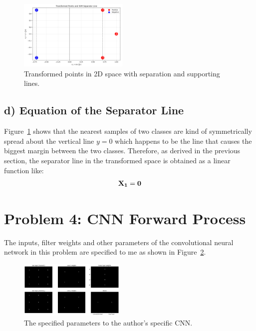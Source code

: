 \documentclass[conference]{IEEEtran}
\begin{document}
\begin{figure}[htbp]
    \centerline{\includegraphics[width=0.465\textwidth]{figures/prob3.png}}
    \caption{Transformed points in 2D space with separation and supporting lines.}
    \label{fig:prob3}
\end{figure}

\subsection*{d) Equation of the Separator Line}
Figure~\ref{fig:prob3} shows that the nearest samples of two classes are kind of symmetrically spread about the vertical line $y = 0$ which happens to be the line that causes the biggest margin between the two classes. Therefore, as derived in the previous section, the separator line in the transformed space is obtained as a linear function like:
\begin{align}
    \Large
    \mathbf{X_1 = 0}
\end{align}
\vspace{12px}

\section{Problem 4: CNN Forward Process}
The inputs, filter weights and other parameters of the convolutional neural network in this problem are specified to me as shown in Figure~\ref{fig:prob4}.
\begin{figure}[htbp]
    \centerline{\includegraphics[width=0.45\textwidth]{figures/prob4.png}}
    \caption{The specified parameters to the author's specific CNN.}
    \label{fig:prob4}
\end{figure}
\end{document}
